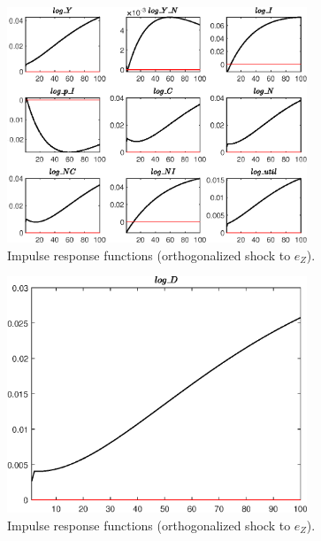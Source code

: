 \begin{figure}[H]
\centering 
\includegraphics[width=0.80\textwidth]{BRS_growth_util/graphs/BRS_growth_util_IRF_e_Z2}
\caption{Impulse response functions (orthogonalized shock to ${e_Z}$).}\label{Fig:IRF:e_Z:2}
\end{figure}
 
\begin{figure}[H]
\centering 
\includegraphics[width=0.80\textwidth]{BRS_growth_util/graphs/BRS_growth_util_IRF_e_Z3}
\caption{Impulse response functions (orthogonalized shock to ${e_Z}$).}\label{Fig:IRF:e_Z:3}
\end{figure}
 

